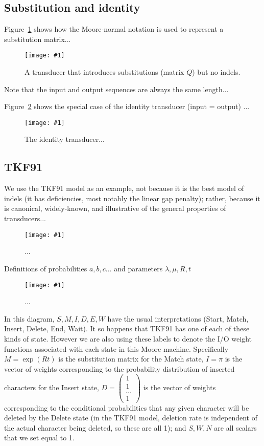 \documentclass{article}
\newcommand{\figref}[1]{Figure~\ref{Figures.#1}}
\newcommand{\figlabel}[1]{\label{Figures.#1}}
\newcommand{\easyfig}[4]{
\begin{figure}
\texttt{[image: \#1]}
\caption{ \figlabel{#3} #4}
\end{figure}}
\newcommand{\pdffig}[2]{\easyfig{#1-fig.pdf}{}{#1}{#2}}
\begin{document}
\subsection{Substitution and identity}

\figref{substituter} shows how the Moore-normal notation is used to represent a substitution matrix...
\pdffig{substituter}{A transducer that introduces substitutions (matrix $Q$) but no indels.}

Note that the input and output sequences are always the same length...

\figref{identity} shows the special case of the identity transducer (input = output) ...
\pdffig{identity}{The identity transducer...}


\subsection{TKF91}

We use the TKF91 model as an example, not because it is the best model of indels
 (it has deficiencies, most notably the linear gap penalty);
rather, because it is canonical, widely-known, and illustrative of the general properties of transducers...

\pdffig{tkf91}{...}

Definitions of probabilities $a,b,c...$ and parameters $\lambda,\mu,R,t$

\pdffig{tkf91-labeled}{...}

In this diagram, $S,M,I,D,E,W$ have the usual interpretations
 (Start, Match, Insert, Delete, End, Wait).
It so happens that TKF91 has one of each of these kinds of state.
However we are also using these labels to denote the I/O weight functions associated with
each state in this Moore machine.
Specifically
 $M=\exp(Rt)$ is the substitution matrix for the Match state,
 $I=\pi$ is the vector of weights
  corresponding to the probability distribution of inserted characters for the Insert state,
 $D=\left( \begin{array}{c} 1 \\ 1 \\ \ldots \\ 1 \end{array} \right)$
 is the vector of weights
  corresponding to the conditional probabilities that any given character will be deleted by the Delete state
  (in the TKF91 model, deletion rate is independent of the actual character being deleted, so these are all 1);
 and $S,W,N$ are all scalars that we set equal to 1.
\end{document}
